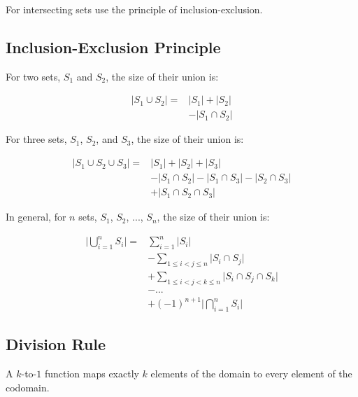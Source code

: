 \documentclass[../main.tex]{subfiles}
\begin{document}
For intersecting sets use the principle of inclusion-exclusion.

\subsection{Inclusion-Exclusion Principle}

For two sets, $S_1$ and $S_2$, the size of their union is:

\begin{align*}
  \lvert S_1 \cup S_2 \rvert = &\lvert S_1 \rvert + \lvert S_2 \rvert \\
                               &- \lvert S_1 \cap S_2 \rvert
\end{align*}

For three sets, $S_1$, $S_2$, and $S_3$, the size of their union is:

\begin{align*}
  \lvert S_1 \cup S_2 \cup S_3 \rvert = &\lvert S_1 \rvert + \lvert S_2 \rvert + \lvert S_3 \rvert \\
                                        &- \lvert S_1 \cap S_2 \rvert - \lvert S_1 \cap S_3 \rvert - \lvert S_2 \cap S_3 \rvert \\
                                        &+ \lvert S_1 \cap S_2 \cap S_3 \rvert
\end{align*}

In general, for $n$ sets, $S_1$, $S_2$, ..., $S_n$, the size of their union is:

\begin{align*}
  \lvert \bigcup_{i=1}^{n}{S_i} \rvert = &\sum_{i=1}^{n}{\lvert S_i \rvert} \\
                                                 &- \sum_{1 \leq i < j \leq n}{\lvert S_i \cap S_j \rvert} \\
                                                 &+ \sum_{1 \leq i < j < k \leq n}{\lvert S_i \cap S_j \cap S_k \rvert} \\
                                                 &- ... \\
                                                 &+ (-1)^{n+1} \lvert \bigcap_{i=1}^{n}{S_i} \rvert
\end{align*}

\subsection{Division Rule}

A $k$-to-$1$ function maps exactly $k$ elements of the domain to every element of the codomain.
\end{document}
